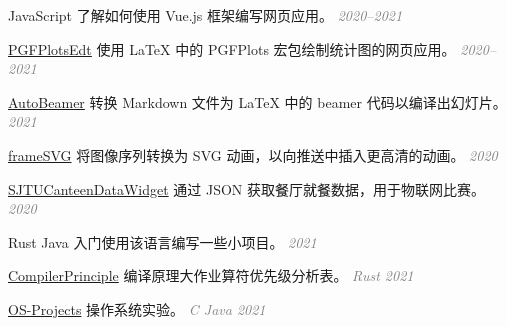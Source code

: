 \documentclass[a4paper]{article}
\newenvironment{cvitems}{
    \begin{justify}
    \begin{description}[
        labelwidth=1.8cm,
        leftmargin=2cm,
        parsep=0pt]
    
}{
    \end{description}
    \end{justify}
}
\newenvironment{githubs}{
    \begin{list}{\faGithubSquare}{
        \setlength{\topsep}{0pt}
        \setlength{\partopsep}{0pt}
        \setlength{\parsep}{0pt}
        \setlength{\itemsep}{0pt}}
}{
    \end{list}
}
\def\githublink#1{
    \href{https://github.com/LogCreative/#1}{\sffamily #1}
}
\def\rightnote#1{
    \hfill\textcolor{gray}{\emph{#1}}
}
\begin{document}
\begin{cvitems}
        \item[JavaScript] 了解如何使用 \textsf{Vue.js} 框架编写网页应用。\rightnote{2020--2021}
        
        \begin{githubs}
            \item \githublink{PGFPlotsEdt} 使用 \LaTeX{} 中的 \textsf{PGFPlots} 宏包绘制统计图的网页应用。\rightnote{2020--2021}
            \item \githublink{AutoBeamer} 转换 Markdown 文件为 \LaTeX{} 中的 \textsf{beamer} 代码以编译出幻灯片。\rightnote{2021}
            \item \href{https://github.com/SJTU-Art-Center/frameSVG}{\sffamily frameSVG} 将图像序列转换为 SVG 动画，以向推送中插入更高清的动画。\rightnote{2020}
            \item \githublink{SJTUCanteenDataWidget} 通过 \textsf{JSON} 获取餐厅就餐数据，用于物联网比赛。\rightnote{2020}
        \end{githubs}
        
        \item[Rust Java] 入门使用该语言编写一些小项目。\rightnote{2021}
        
        \begin{githubs}
            \item \githublink{CompilerPrinciple} 编译原理大作业算符优先级分析表。\rightnote{Rust 2021}
            \item \githublink{OS-Projects} 操作系统实验。\rightnote{C Java 2021}
        \end{githubs}
    \end{cvitems}


\end{document}
